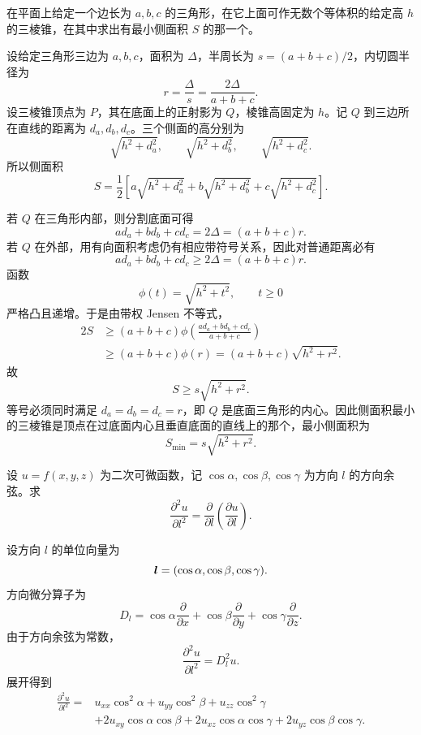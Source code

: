 \begin{xreferenceproblem}[2]
在平面上给定一个边长为 $a,b,c$ 的三角形，在它上面可作无数个等体积的给定高 $h$ 的三棱锥，在其中求出有最小侧面积 $S$ 的那一个。
\end{xreferenceproblem}
\begin{xsolution}
设给定三角形三边为 $a,b,c$，面积为 $\Delta$，半周长为 $s=(a+b+c)/2$，内切圆半径为
\[
  r=\frac{\Delta}{s}=
  \frac{2\Delta}{a+b+c}.
\]
设三棱锥顶点为 $P$，其在底面上的正射影为 $Q$，棱锥高固定为 $h$。记 $Q$ 到三边所在直线的距离为 $d_a,d_b,d_c$。三个侧面的高分别为
\[
  \sqrt{h^2+d_a^2},
  \qquad
  \sqrt{h^2+d_b^2},
  \qquad
  \sqrt{h^2+d_c^2}.
\]
所以侧面积
\[
  S=\frac12\left[
  a\sqrt{h^2+d_a^2}
  +b\sqrt{h^2+d_b^2}
  +c\sqrt{h^2+d_c^2}
  \right].
\]

若 $Q$ 在三角形内部，则分割底面可得
\[
  ad_a+bd_b+cd_c=2\Delta=(a+b+c)r.
\]
若 $Q$ 在外部，用有向面积考虑仍有相应带符号关系，因此对普通距离必有
\[
  ad_a+bd_b+cd_c\ge2\Delta=(a+b+c)r.
\]
函数
\[
  \phi(t)=\sqrt{h^2+t^2},\qquad t\ge0
\]
严格凸且递增。于是由带权 Jensen 不等式，
\[
\begin{aligned}
  2S
  &\ge(a+b+c)
  \phi\left(\frac{ad_a+bd_b+cd_c}{a+b+c}\right)\\
  &\ge(a+b+c)\phi(r)
  =(a+b+c)\sqrt{h^2+r^2}.
\end{aligned}
\]
故
\[
  S\ge s\sqrt{h^2+r^2}.
\]
等号必须同时满足 $d_a=d_b=d_c=r$，即 $Q$ 是底面三角形的内心。因此侧面积最小的三棱锥是顶点在过底面内心且垂直底面的直线上的那个，最小侧面积为
\[
  S_{\min}=s\sqrt{h^2+r^2}.
\]
\end{xsolution}


\begin{xreferenceproblem}[3]
设 $u=f(x,y,z)$ 为二次可微函数，记 $\cos\alpha,\cos\beta,\cos\gamma$ 为方向 $l$ 的方向余弦。求
  \[
    \frac{\partial^2u}{\partial l^2}=\frac{\partial}{\partial l}\left(\frac{\partial u}{\partial l}\right).
  \]
\end{xreferenceproblem}
\begin{xsolution}
设方向 $l$ 的单位向量为
\[
  \bm{l}=(\cos\alpha,\cos\beta,\cos\gamma).
\]
方向微分算子为
\[
  D_l=\cos\alpha\frac{\partial}{\partial x}
  +\cos\beta\frac{\partial}{\partial y}
  +\cos\gamma\frac{\partial}{\partial z}.
\]
由于方向余弦为常数，
\[
  \frac{\partial^2u}{\partial l^2}=D_l^2u.
\]
展开得到
\[
\begin{aligned}
  \frac{\partial^2u}{\partial l^2}
  ={}&u_{xx}\cos^2\alpha
  +u_{yy}\cos^2\beta
  +u_{zz}\cos^2\gamma\\
  &+2u_{xy}\cos\alpha\cos\beta
  +2u_{xz}\cos\alpha\cos\gamma
  +2u_{yz}\cos\beta\cos\gamma.
\end{aligned}
\]
\end{xsolution}


